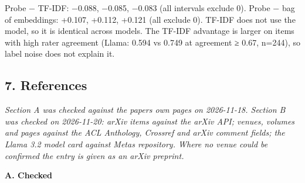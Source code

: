 \documentclass[
  10pt,
]{article}
\begin{document}
Probe − TF-IDF: −0.088, −0.085, −0.083 (all intervals exclude 0). Probe
− bag of embeddings: +0.107, +0.112, +0.121 (all exclude 0). TF-IDF does
not use the model, so it is identical across models. The TF-IDF
advantage is larger on items with high rater agreement (Llama: 0.594 vs
0.749 at agreement ≥ 0.67, n=244), so label noise does not explain it.

\subsection{7. References}\label{7-references}

\emph{Section A was checked against the papers\textquotesingle{} own
pages on 2026-11-18. Section B was checked on 2026-11-20: arXiv items
against the arXiv API; venues, volumes and pages against the ACL
Anthology, Crossref and arXiv comment fields; the Llama 3.2 model card
against Meta\textquotesingle s repository. Where no venue could be
confirmed the entry is given as an arXiv preprint.}

\textbf{A. Checked}
\end{document}
